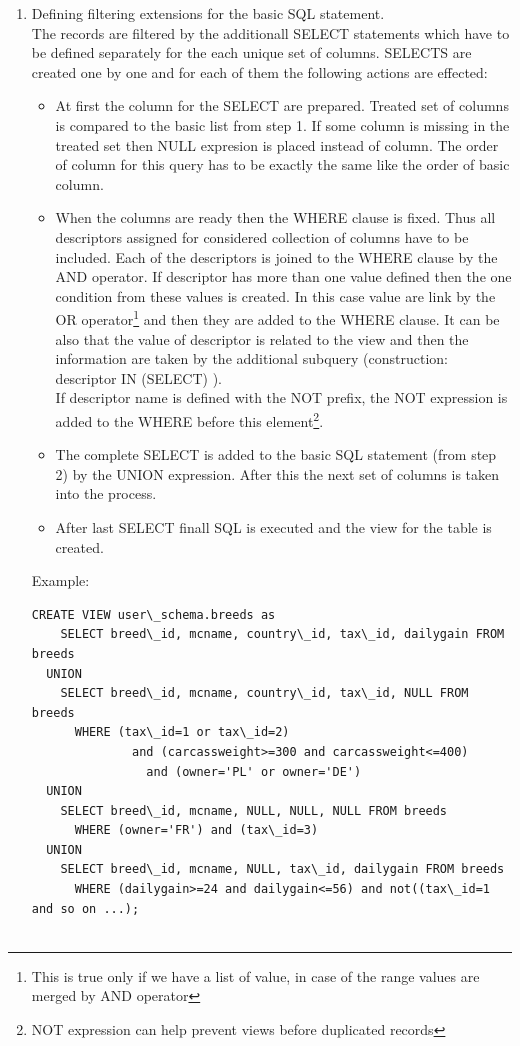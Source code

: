 \begin{enumerate}
\item Defining filtering extensions for the basic SQL statement.\\
The records are filtered by the additionall SELECT statements which have to be defined separately for the each unique set of columns.  SELECTS are created one by one and for each of them the following actions are effected:
\begin{itemize}
\item At first the column for the SELECT are prepared. Treated set of columns is compared to the basic list from step 1. If some column is missing in the treated set then NULL expresion is placed instead of column. The order of column for this query has to be exactly the same like the order of basic column.
\item When the columns are ready then the WHERE clause is fixed. Thus all descriptors assigned for considered collection of columns have to be included. Each of the descriptors is joined to the WHERE clause by the AND operator. If descriptor has more than one value defined then the one condition from these values is created. In this case value are link by the OR operator\footnote{This is true only if we have a list of value, in case of the range values are merged by AND operator} and then they are added to the WHERE clause. It can be also that the value of descriptor is related to the view and then the information are taken by the additional subquery (construction: descriptor IN (SELECT) ).\\
If descriptor name is defined with the NOT prefix, the NOT expression is added to the WHERE before this element\footnote{NOT expression can help prevent views before duplicated records}.
\item The complete SELECT is added to the basic SQL statement (from step 2) by the UNION expression. After this the next set of columns is taken into the process.
\item After last SELECT finall SQL is executed and the view for the table is created.
\end{itemize}

Example:
\begin{verbatim}
CREATE VIEW user\_schema.breeds as 
    SELECT breed\_id, mcname, country\_id, tax\_id, dailygain FROM breeds
  UNION
    SELECT breed\_id, mcname, country\_id, tax\_id, NULL FROM breeds
      WHERE (tax\_id=1 or tax\_id=2) 
              and (carcassweight>=300 and carcassweight<=400)
                and (owner='PL' or owner='DE') 
  UNION
    SELECT breed\_id, mcname, NULL, NULL, NULL FROM breeds
      WHERE (owner='FR') and (tax\_id=3)
  UNION
    SELECT breed\_id, mcname, NULL, tax\_id, dailygain FROM breeds
      WHERE (dailygain>=24 and dailygain<=56) and not((tax\_id=1 and so on ...); 


\end{verbatim}
\end{enumerate}
